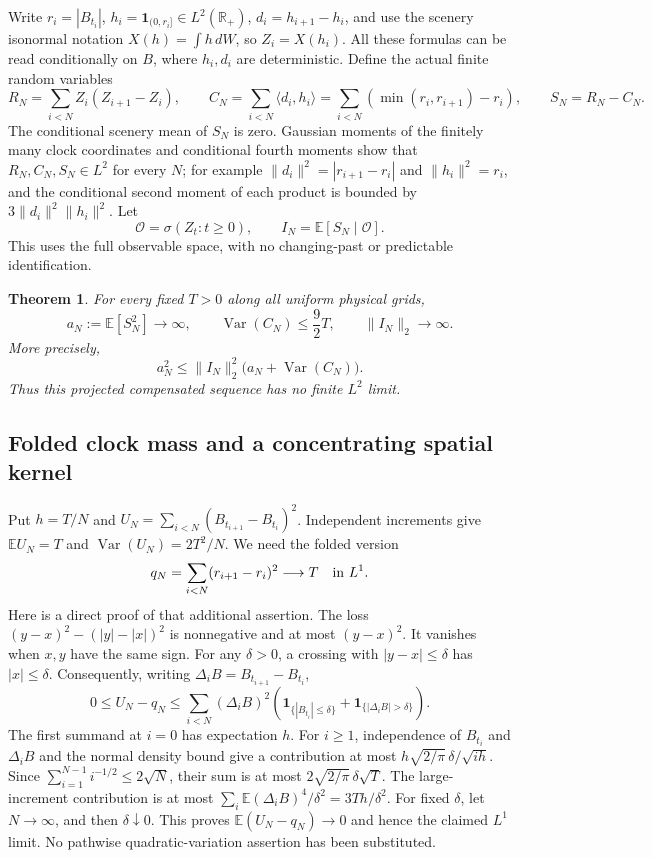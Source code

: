 \documentclass[11pt]{article}
\newtheorem{theorem}{Theorem}[section]
\theoremstyle{remark}\newtheorem{remark}[theorem]{Remark}
\newcommand{\R}{\mathbb R}\newcommand{\Pconv}{\xrightarrow{\mathrm P}}
\begin{document}
Write $r_i=|B_{t_i}|$, $h_i=\mathbf1_{(0,r_i]}\in L^2(\R_+)$,
$d_i=h_{i+1}-h_i$, and use the scenery isonormal notation
$X(h)=\int h\,dW$, so $Z_i=X(h_i)$. All these formulas can be
read conditionally on $B$, where $h_i,d_i$ are deterministic.
Define the actual finite random variables
\[
 R_N=\sum_{i<N}Z_i(Z_{i+1}-Z_i),\qquad
 C_N=\sum_{i<N}\langle d_i,h_i\rangle
 =\sum_{i<N}(\min(r_i,r_{i+1})-r_i),\qquad
 S_N=R_N-C_N.
\]
The conditional scenery mean of $S_N$ is zero. Gaussian moments of
the finitely many clock coordinates and conditional fourth moments
show that $R_N,C_N,S_N\in L^2$ for every $N$; for example
$\|d_i\|^2=|r_{i+1}-r_i|$ and $\|h_i\|^2=r_i$, and
the conditional second moment of each product is bounded by
$3\|d_i\|^2\|h_i\|^2$. Let
\[
 \mathcal O=\sigma(Z_t:t\geq0),\qquad
 I_N=\mathbb E[S_N\mid\mathcal O].
\]
This uses the full observable space, with no changing-past or
predictable identification.

\begin{theorem}\label{thm:nativeescape}
For every fixed $T>0$ along all uniform physical grids,
\[
 a_N:=\mathbb E[S_N^2]\longrightarrow\infty,\qquad
 \operatorname{Var}(C_N)\leq\frac92T,
 \qquad \|I_N\|_2\longrightarrow\infty.
\]
More precisely,
\[
 a_N^2\leq\|I_N\|_2^2
       \bigl(a_N+\operatorname{Var}(C_N)\bigr).
\]
Thus this projected compensated sequence has no finite $L^2$ limit.
\end{theorem}

\subsection{Folded clock mass and a concentrating spatial kernel}
Put $h=T/N$ and $U_N=\sum_{i<N}(B_{t_{i+1}}-B_{t_i})^2$.
Independent increments give $\mathbb E U_N=T$ and
$\operatorname{Var}(U_N)=2T^2/N$. We need the folded version
\[
 q_N=\sum_{i<N}(r_{i+1}-r_i)^2\longrightarrow T
 \quad\hbox{in }L^1.
\]
Here is a direct proof of that additional assertion. The loss
$(y-x)^2-(|y|-|x|)^2$ is nonnegative and at most $(y-x)^2$.
It vanishes when $x,y$ have the same sign. For any $\delta>0$,
a crossing with $|y-x|\leq\delta$ has $|x|\leq\delta$.
Consequently, writing $\Delta_iB=B_{t_{i+1}}-B_{t_i}$,
\[
 0\leq U_N-q_N\leq\sum_{i<N}(\Delta_iB)^2
 \left(\mathbf1_{\{|B_{t_i}|\leq\delta\}}+
       \mathbf1_{\{|\Delta_iB|>\delta\}}\right).
\]
The first summand at $i=0$ has expectation $h$. For $i\geq1$,
independence of $B_{t_i}$ and $\Delta_iB$ and the normal density bound
give a contribution at most
$h\sqrt{2/\pi}\,\delta/\sqrt{ih}$.
Since $\sum_{i=1}^{N-1}i^{-1/2}\leq2\sqrt N$, their sum is at
most $2\sqrt{2/\pi}\,\delta\sqrt T$.
The large-increment contribution is at most
$\sum_i\mathbb E(\Delta_iB)^4/\delta^2=3Th/\delta^2$.
For fixed $\delta$, let $N\to\infty$, and then $\delta\downarrow0$.
This proves $\mathbb E(U_N-q_N)\to0$ and hence the claimed $L^1$
limit. No pathwise quadratic-variation assertion has been substituted.
\end{document}
